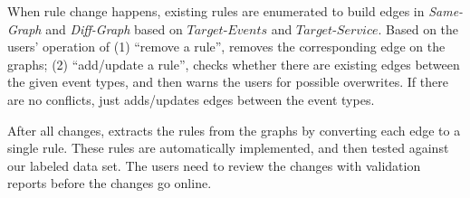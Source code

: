 When rule change happens, existing rules are enumerated to build edges in \emph{Same-Graph} and \emph{Diff-Graph} based on $Target\mbox{-}Events$ and $Target\mbox{-}Service$. Based on the users' operation of 
    (1) ``remove a rule'',  \system removes the corresponding edge on the graphs;
    (2) ``add/update a rule'',  \system checks whether there are existing edges between the given event types, and then warns the users for possible overwrites. 
    If there are no conflicts, \system just adds/updates edges between the event types.

After all changes, \system extracts the rules from the graphs by converting each edge to a single rule. These rules are automatically implemented, and then tested against our labeled data set. The \system users need to review the changes with validation reports before the changes go online.

